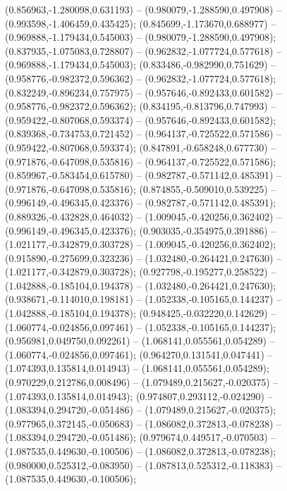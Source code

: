  (0.856963,-1.280098,0.631193) -- (0.980079,-1.288590,0.497908) -- (0.993598,-1.406459,0.435425);
 (0.845699,-1.173670,0.688977) -- (0.969888,-1.179434,0.545003) -- (0.980079,-1.288590,0.497908);
 (0.837935,-1.075083,0.728807) -- (0.962832,-1.077724,0.577618) -- (0.969888,-1.179434,0.545003);
 (0.833486,-0.982990,0.751629) -- (0.958776,-0.982372,0.596362) -- (0.962832,-1.077724,0.577618);
 (0.832249,-0.896234,0.757975) -- (0.957646,-0.892433,0.601582) -- (0.958776,-0.982372,0.596362);
 (0.834195,-0.813796,0.747993) -- (0.959422,-0.807068,0.593374) -- (0.957646,-0.892433,0.601582);
 (0.839368,-0.734753,0.721452) -- (0.964137,-0.725522,0.571586) -- (0.959422,-0.807068,0.593374);
 (0.847891,-0.658248,0.677730) -- (0.971876,-0.647098,0.535816) -- (0.964137,-0.725522,0.571586);
 (0.859967,-0.583454,0.615780) -- (0.982787,-0.571142,0.485391) -- (0.971876,-0.647098,0.535816);
 (0.874855,-0.509010,0.539225) -- (0.996149,-0.496345,0.423376) -- (0.982787,-0.571142,0.485391);
 (0.889326,-0.432828,0.464032) -- (1.009045,-0.420256,0.362402) -- (0.996149,-0.496345,0.423376);
 (0.903035,-0.354975,0.391886) -- (1.021177,-0.342879,0.303728) -- (1.009045,-0.420256,0.362402);
 (0.915890,-0.275699,0.323236) -- (1.032480,-0.264421,0.247630) -- (1.021177,-0.342879,0.303728);
 (0.927798,-0.195277,0.258522) -- (1.042888,-0.185104,0.194378) -- (1.032480,-0.264421,0.247630);
 (0.938671,-0.114010,0.198181) -- (1.052338,-0.105165,0.144237) -- (1.042888,-0.185104,0.194378);
 (0.948425,-0.032220,0.142629) -- (1.060774,-0.024856,0.097461) -- (1.052338,-0.105165,0.144237);
 (0.956981,0.049750,0.092261) -- (1.068141,0.055561,0.054289) -- (1.060774,-0.024856,0.097461);
 (0.964270,0.131541,0.047441) -- (1.074393,0.135814,0.014943) -- (1.068141,0.055561,0.054289);
 (0.970229,0.212786,0.008496) -- (1.079489,0.215627,-0.020375) -- (1.074393,0.135814,0.014943);
 (0.974807,0.293112,-0.024290) -- (1.083394,0.294720,-0.051486) -- (1.079489,0.215627,-0.020375);
 (0.977965,0.372145,-0.050683) -- (1.086082,0.372813,-0.078238) -- (1.083394,0.294720,-0.051486);
 (0.979674,0.449517,-0.070503) -- (1.087535,0.449630,-0.100506) -- (1.086082,0.372813,-0.078238);
 (0.980000,0.525312,-0.083950) -- (1.087813,0.525312,-0.118383) -- (1.087535,0.449630,-0.100506);
